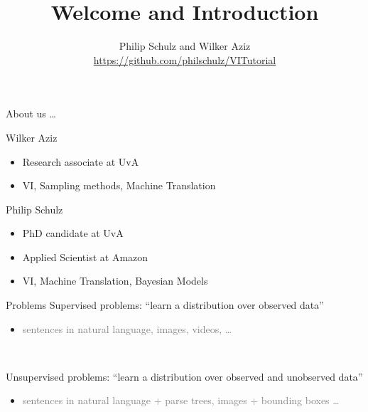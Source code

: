 \documentclass[14pt]{beamer}
\title{Welcome and Introduction}
\date{}
\author[Schulz and Aziz]{Philip Schulz and Wilker Aziz \\
\url{https://github.com/philschulz/VITutorial}}
\begin{document}
\frame{\titlepage}

\begin{frame}{About us \ldots}
\begin{block}{Wilker Aziz}
\begin{itemize}
\item Research associate at UvA
\item VI, Sampling methods, Machine Translation
\end{itemize}
\end{block}

\begin{block}{Philip Schulz}
\begin{itemize}
\item PhD candidate at UvA
\item Applied Scientist at Amazon
\item VI, Machine Translation, Bayesian Models
\end{itemize}
\end{block}
\end{frame}

\begin{frame}{Problems}
Supervised problems: \alert{``learn a distribution over observed data''}
\begin{itemize}
	\item \textcolor{gray}{sentences in natural language, images, videos, \ldots}
\end{itemize}

~

Unsupervised problems: \alert{``learn a distribution over observed and unobserved data''}
\begin{itemize}
	\item \textcolor{gray}{sentences in natural language + parse trees, images + bounding boxes \ldots}
\end{itemize}
\end{frame}
\end{document}
